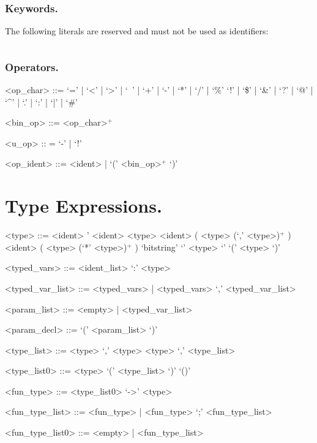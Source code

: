 \subsubsection*{Keywords.} The following literals are reserved and must
not be used as identifiers:
\begin{verbatim}
\end{verbatim}

\subsubsection*{Operators.}
\begin{ecgrammar}

<op_char> ::= `=' | `<' | `>' | `~' | `+' | `-' | `*' | `/' | `\%'
          \alt `!' | `\$' | `&' | `?' | `@' |  `^' | `.' | `:' | `|' |  `#'

<bin_op> ::= <op_char>$^+$

<u_op> :: = `-' | `!'

<op_ident> ::= <ident> | `(' <bin_op>$^+$ `)'
\end{ecgrammar}





\section{Type Expressions.}
\begin{ecgrammar}
<type> ::=  <ident>
       \alt ' <ident>
       \alt <type> <ident>
       \alt ( <type> (`,' <type>)$^+$ ) <ident>
       \alt ( <type> (`*' <type>)$^+$ )
       \alt `bitstring' `{' <type> `}'
       \alt `(' <type> `)'

<typed_vars> ::=  <ident_list> `:'  <type>

<typed_var_list> ::= <typed_vars> | <typed_vars> `,'  <typed_var_list>

<param_list> ::= <empty> | <typed_var_list> 

<param_decl> ::= `(' <param_list> `)'

<type_list> ::=  <type> `,' <type>
           \alt <type> `,' <type_list>

<type_list0> ::=  <type>
             \alt `(' <type_list> `)'
             \alt `()'

<fun_type> ::= <type_list0> `->' <type> 

<fun_type_list> ::= <fun_type> | <fun_type> `;' <fun_type_list>

<fun_type_list0> ::= <empty> | <fun_type_list>

\end{ecgrammar}



